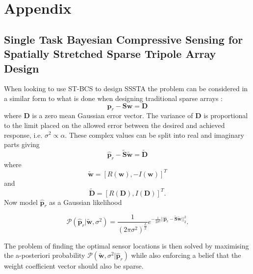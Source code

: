\documentclass[10pt,final]{IEEEtran}
\begin{document}
\section*{Appendix}
\subsection{Single Task Bayesian Compressive Sensing for Spatially Stretched Sparse Tripole Array Design}
When looking to use ST-BCS to design SSSTA the problem can be considered in a similar form to what is done when designing traditional sparse arrays \cite{Oliveri11a,Oliveri12,Viani13,Oliveri12a}:
\begin{equation}\label{eq:bcs1}
  \textbf{p}_{r}-\textbf{Sw} = \textbf{D}
\end{equation}
where $\textbf{D}$ is a zero mean Gaussian error vector.  The variance of $\textbf{D}$ is proportional to the limit placed on the allowed error between the desired and achieved response, i.e. $\sigma^{2}\propto\alpha$.  These complex values can be split into real and imaginary parts giving
\begin{equation}\label{eq:bcs2}
  \hat{\textbf{p}}_{r}-\tilde{\textbf{S}}\tilde{\textbf{w}} = \tilde{\textbf{D}}
\end{equation}
where
\begin{equation}\label{eq:bcs4}
  \tilde{\textbf{w}} = [R(\textbf{w}),-I(\textbf{w})]^{T}
\end{equation}
and
\begin{equation}\label{eq:bcs5}
  \tilde{\textbf{D}}=[R(\textbf{D}),I(\textbf{D})]^{T}.
\end{equation}
Now model $\hat{\textbf{p}}_{r}$ as a Gaussian likelihood

\begin{equation}\label{eq:bcs6}
  \mathcal{P}(\hat{\textbf{p}}_{r}|\tilde{\textbf{w}},\sigma^{2})=\frac{1}{(2\pi\sigma^{2})^{\frac{L}{2}}}e^{-\frac{1}{2\sigma^{2}}||\hat{\textbf{p}}_{r}-\tilde{\textbf{S}}\tilde{\textbf{w}}||^{2}_{2}}.
\end{equation}

The problem of finding the optimal sensor locations is then solved by maximising the a-posteriori probability $\mathcal{P}(\tilde{\textbf{w}},\sigma^{2}|\hat{\textbf{p}}_{r})$ while also enforcing a belief that the weight coefficient vector should also be sparse.
\end{document}
